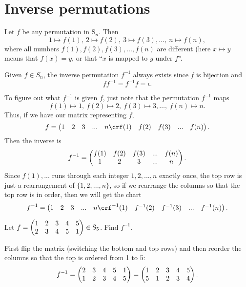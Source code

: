 \documentclass[11pt,dvipsnames]{book}
\numberwithin{figure}{section} %
\numberwithin{table}{section} %
\begin{document}
\section{Inverse permutations}%
\label{inverseofpermutation}

Let $f$ be any permutation in $\mathrm{S}_n$.  Then
$$
1\mapsto f(1),\  2\mapsto f(2),\  3\mapsto f(3),  \ldots,\  n\mapsto f(n),%
$$
where all numbers $f(1), f(2), f(3),\ldots, f(n)$ are different (here $x\mapsto y$ means that $f(x)=y$, or that ``$x$ is mapped to $y$ under $f$''.

Given $f\in S_{n}$, the inverse permutation $f^{-1}$ always exists since $f$ is bijection and
$$
f f^{-1}=f^{-1} f=\iota.
$$

To figure out what $f^{-1}$ is given $f$, just note that the permutation $f^{-1}$ maps
$$
f(1)\mapsto 1,\  f(2)\mapsto 2,\  f(3)\mapsto 3,  \ldots,\  f(n)\mapsto n.%
$$
Thus, if we have our matrix representing $f$, 
\[
f=\left(\begin{matrix} %
1 & 2 & 3 & ... & n\cr%
f(1) & f(2) & f(3) & ... & f(n)\cr%
\end{matrix}\right).
\]
Then the inverse is 
\[
f^{-1}=\left(\begin{matrix} %
f(1) & f(2) & f(3) & ... & f(n)\cr%
1 & 2 & 3 & ... & n\cr%
\end{matrix}\right).
\]
Since $f(1),...$ runs through each integer $1,2,...,n$ exactly once, the top row is just a rearrangement of $\{1,2,...,n\}$, so if we rearrange the columns so that the top row is in order, then we will get the chart
\[
f^{-1}=\left(\begin{matrix} %
1 & 2 & 3 & ... & n\cr%
f^{-1}(1) & f^{-1}(2) & f^{-1}(3) & ... & f^{-1}(n)\cr%
\end{matrix}\right).
\]

\begin{example}  Let $f=\left(\begin{matrix} %
1 & 2 & 3 & 4 & 5\cr%
2 & 3 & 4 & 5 & 1\cr%
\end{matrix}\right)\in\mathrm{S}_5$.   Find $f^{-1}$.

First flip the matrix (switching the bottom and top rows) and then reorder the columns so that the top is ordered from 1 to 5:
\[
f^{-1} = \left(\begin{matrix} %
2 & 3 & 4 & 5 & 1\cr%
1 & 2 & 3 & 4 & 5\cr%
\end{matrix}\right)
=\left(\begin{matrix} %
1 & 2 & 3 & 4 & 5\cr%
5 & 1 & 2 & 3 & 4\cr%
\end{matrix}\right).
\]
\end{example}
\end{document}

